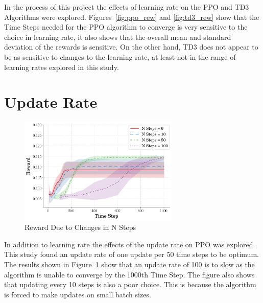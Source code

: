 \documentclass[10pt,twocolumn,letterpaper]{article}
\begin{document}
In the process of this project the effects of learning rate on the PPO and TD3 Algorithms were explored.
Figures~\ref{fig:ppo_rew} and \ref{fig:td3_rew} show that the Time Steps needed for the PPO algorithm to converge is very sensitive to the choice in learning rate, it also shows that the overall mean and standard deviation of the rewards is sensitive. On the other hand, TD3 does not appear to be as sensitive to changes to the learning rate, at least not in the range of learning rates explored in this study.

\section{Update Rate}
\label{app:ur_changes}

\begin{figure}[b]
\begin{center}
        \includegraphics[width = 3in]{figures/ppo_n_steps/avg_rew_ppo.png}
        \caption{Reward Due to Changes in N Steps}
        \label{fig:n_steps}
\end{center}
\end{figure}

In addition to learning rate the effects of the update rate on PPO was explored. This study found an update rate of one update per 50 time steps to be optimum. The results shown in Figure~\ref{fig:n_steps} show that an update rate of 100 is to slow as the algorithm is unable to converge by the 1000th Time Step. The figure also shows that updating every 10 steps is also a poor choice. This is because the algorithm is forced to make updates on small batch sizes.
\end{document}
